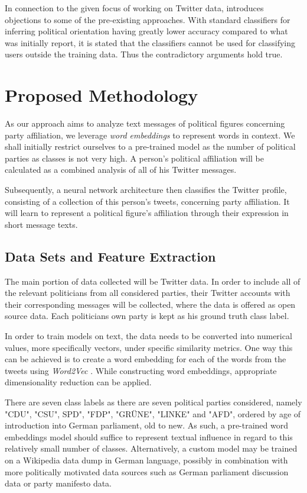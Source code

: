 \documentclass[10pt, oneside]{article}
\begin{document}
\begin{multicols}{2}
In connection to the given focus of working on Twitter data, \cite{Cohen2013} introduces objections to some of the pre-existing approaches. With standard classifiers for inferring political orientation having greatly lower accuracy compared to what was initially report, it is stated that the classifiers cannot be used for classifying users outside the training data. Thus the contradictory arguments hold true.


\section{Proposed Methodology}

As our approach aims to analyze text messages of political figures concerning party affiliation, we leverage \textit{word embeddings} to represent words in context. We shall initially restrict ourselves to a pre-trained model as the number of political parties as classes is not very high. A person's political affiliation will be calculated as a combined analysis of all of his Twitter messages.

Subsequently, a neural network architecture then classifies the Twitter profile, consisting of a collection of this person's tweets, concerning party affiliation. It will learn to represent a political figure's affiliation through their expression in short message texts.

\subsection{Data Sets and Feature Extraction} 

The main portion of data collected will be Twitter data. In order to include all of the relevant politicians from all considered parties, their Twitter accounts with their corresponding messages will be collected, where the data is offered as open source data.
Each politicians own party is kept as his ground truth class label.

In order to train models on text, the data needs to be converted into numerical values, more specifically vectors, under specific similarity metrics. One way this can be achieved is to create a word embedding for each of the words from the tweets using \textit{Word2Vec} \cite{DBLP:journals/corr/abs-1301-3781}. While constructing word embeddings, appropriate dimensionality reduction can be applied.

There are seven class labels as there are seven political parties considered, namely "CDU", "CSU", SPD", "FDP", "GRÜNE", "LINKE" and "AFD", ordered by age of introduction into German parliament, old to new. As such, a pre-trained word embeddings model should suffice to represent textual influence in regard to this relatively small number of classes.
Alternatively, a custom model may be trained on a Wikipedia data dump in German language, possibly in combination with more politically motivated data sources such as German parliament discussion data or party manifesto data. 


\end{multicols}
\end{document}
